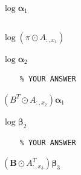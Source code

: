 \documentclass[11pt,addpoints,answers]{exam}
\newcommand{\Av}{\mathbf{A}}
\newcommand{\Bv}{\mathbf{B}}
\newcommand{\alphav     }{\boldsymbol \alpha     }
\newcommand{\betav      }{\boldsymbol \beta      }
\newcommand{\piv        }{\boldsymbol \pi        }
\begin{document}
\begin{questions}
\begin{parts}
    \begin{subparts}
    \subpart[2]$\log\alphav_1$\\
    \begin{your_solution}[height=4cm]
    \begin{lstlisting}
    \end{lstlisting}
    $\log(\pi \odot A_{:,x_1})$
    \end{your_solution} 
    \subpart[2]$\log\alphav_2$\\
    \begin{your_solution}[height=4cm]
    \begin{lstlisting}
    % YOUR ANSWER
    \end{lstlisting}
    $(B^T \odot A_{:,x_2})\alphav_1$
    \end{your_solution} 
    \subpart[2]$\log\betav_2$\\
    \begin{your_solution}[height=4cm]
    \begin{lstlisting}
    % YOUR ANSWER 
    \end{lstlisting}
    $(\mathbf{B} \odot
A_{:,x_3}^T)\bm\beta_3$
    \end{your_solution} 
    \end{subparts}
    

\end{parts}


\end{questions}
\end{document}
